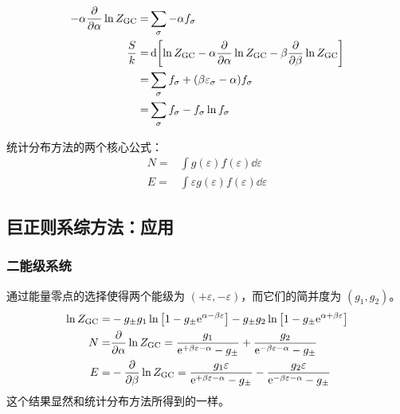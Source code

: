 \begin{framed}
\begin{align*}
        - \alpha \pdv{\alpha} \ln{Z_{\text{GC}}} = & \sum_{\sigma} - \alpha f_{\sigma}                                                                             \\
        \frac{S}{k} =                              & \dd{\qty[\ln{Z_{\text{GC}}} - \alpha \pdv{\alpha} \ln{Z_{\text{GC}}} - \beta \pdv{\beta} \ln{Z_{\text{GC}}}]} \\
        =                                          & \sum_{\sigma} f_{\sigma} + (\beta \varepsilon_{\sigma} - \alpha) f_{\sigma}                                   \\
        =                                          & \sum_{\sigma} f_{\sigma} - f_{\sigma} \ln{f_{\sigma}}
    \end{align*}
\end{framed}
统计分布方法的两个核心公式：
\begin{align*}
    N = & \int g(\varepsilon) f(\varepsilon) \dd{\varepsilon}             \\
    E = & \int \varepsilon g(\varepsilon) f(\varepsilon) \dd{\varepsilon}
\end{align*}

\subsection{巨正则系综方法：应用}

\subsubsection{二能级系统}

通过能量零点的选择使得两个能级为 $(+ \varepsilon, - \varepsilon)$，而它们的简并度为 $(g_1, g_2)$。\begin{align*}
    \ln{Z_{\text{GC}}} = & - g_{\pm} g_1 \ln \qty[1 - g_{\pm} \mathrm{e}^{\alpha - \beta \varepsilon}] - g_{\pm} g_2 \ln \qty[1 - g_{\pm} \mathrm{e}^{\alpha + \beta \varepsilon}]                                      \\
    N =                  & \pdv{\alpha} \ln{Z_{\text{GC}}} = \frac{g_1}{\mathrm{e}^{+ \beta \varepsilon - \alpha} - g_{\pm}} + \frac{g_2}{\mathrm{e}^{- \beta \varepsilon - \alpha} - g_{\pm}}                          \\
    E =                  & - \pdv{\beta} \ln{Z_{\text{GC}}} = \frac{g_1 \varepsilon}{\mathrm{e}^{+ \beta \varepsilon - \alpha} - g_{\pm}} - \frac{g_2 \varepsilon}{\mathrm{e}^{- \beta \varepsilon - \alpha} - g_{\pm}}
\end{align*}
这个结果显然和统计分布方法所得到的一样。

